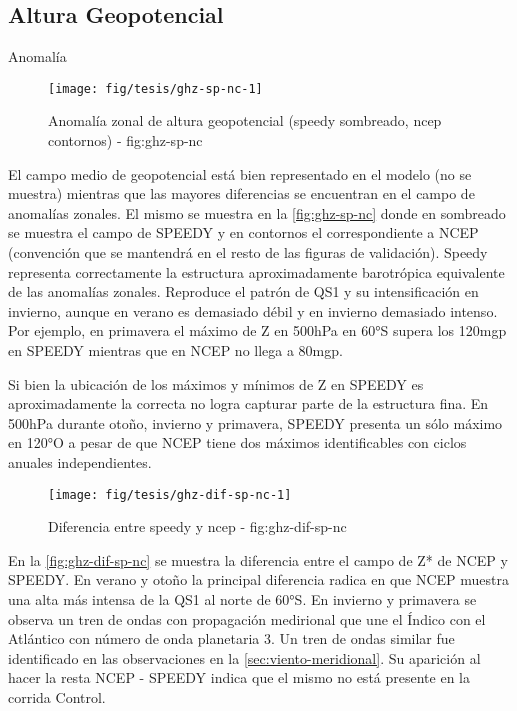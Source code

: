 \documentclass[spanish,a4paper]{book}
\begin{document}
\subsection{Altura Geopotencial}\label{altura-geopotencial-1}

Anomalía

\begin{landscape}\begin{figure}

{\centering \texttt{[image: fig/tesis/ghz-sp-nc-1]} 

}

\caption{Anomalía zonal de altura geopotencial (speedy sombreado, ncep contornos) - fig:ghz-sp-nc}\label{fig:ghz-sp-nc}
\end{figure}
\end{landscape}

El campo medio de geopotencial está bien representado en el modelo (no
se muestra) mientras que las mayores diferencias se encuentran en el
campo de anomalías zonales. El mismo se muestra en la
\autoref{fig:ghz-sp-nc} donde en sombreado se muestra el campo de SPEEDY
y en contornos el correspondiente a NCEP (convención que se mantendrá en
el resto de las figuras de validación). Speedy representa correctamente
la estructura aproximadamente barotrópica equivalente de las anomalías
zonales. Reproduce el patrón de QS1 y su intensificación en invierno,
aunque en verano es demasiado débil y en invierno demasiado intenso. Por
ejemplo, en primavera el máximo de Z en 500hPa en 60°S supera los 120mgp
en SPEEDY mientras que en NCEP no llega a 80mgp.

Si bien la ubicación de los máximos y mínimos de Z en SPEEDY es
aproximadamente la correcta no logra capturar parte de la estructura
fina. En 500hPa durante otoño, invierno y primavera, SPEEDY presenta un
sólo máximo en 120°O a pesar de que NCEP tiene dos máximos
identificables con ciclos anuales independientes.

\begin{landscape}\begin{figure}

{\centering \texttt{[image: fig/tesis/ghz-dif-sp-nc-1]} 

}

\caption{Diferencia entre speedy y ncep - fig:ghz-dif-sp-nc}\label{fig:ghz-dif-sp-nc}
\end{figure}
\end{landscape}

En la \autoref{fig:ghz-dif-sp-nc} se muestra la diferencia entre el
campo de Z* de NCEP y SPEEDY. En verano y otoño la principal diferencia
radica en que NCEP muestra una alta más intensa de la QS1 al norte de
60°S. En invierno y primavera se observa un tren de ondas con
propagación medirional que une el Índico con el Atlántico con número de
onda planetaria 3. Un tren de ondas similar fue identificado en las
observaciones en la \autoref{sec:viento-meridional}. Su aparición al
hacer la resta NCEP - SPEEDY indica que el mismo no está presente en la
corrida Control.
\end{document}
